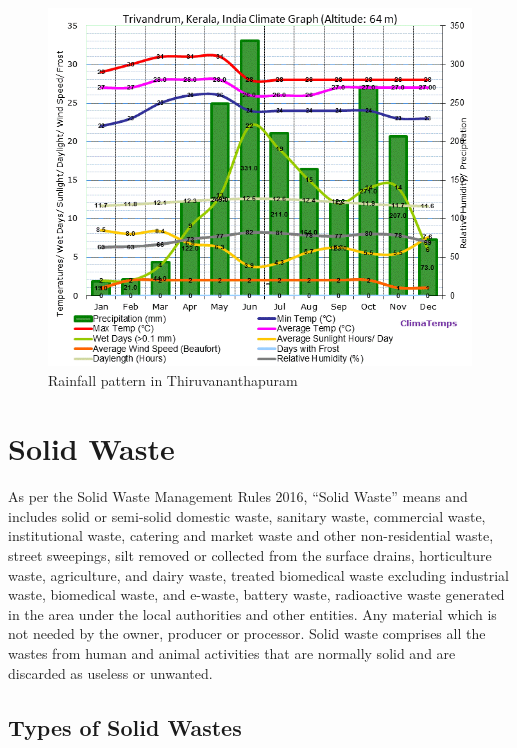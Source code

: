 \documentclass[12pt,a4paper]{report}
\begin{document}
\begin{figure}[H]
	\centering
	\includegraphics[width=0.75\linewidth]{kcr}
	\caption{Rainfall pattern in Thiruvananthapuram}
	\label{fig:kcr}
\end{figure}

	
\section{Solid Waste}
As per the Solid Waste Management Rules 2016, “Solid Waste” means and includes solid or semi-solid domestic waste, sanitary waste, commercial waste, institutional waste, catering and market waste and other non-residential waste, street sweepings, silt removed or collected from the surface drains, horticulture waste, agriculture, and dairy waste, treated biomedical waste excluding industrial waste, biomedical waste, and e-waste, battery waste, radioactive waste generated in the area under the local authorities and other entities. Any material which is not needed by the owner, producer or processor. Solid waste comprises all the wastes from human and animal activities that are normally solid and are discarded as useless or unwanted.

\subsection{Types of Solid Wastes}
\end{document}
